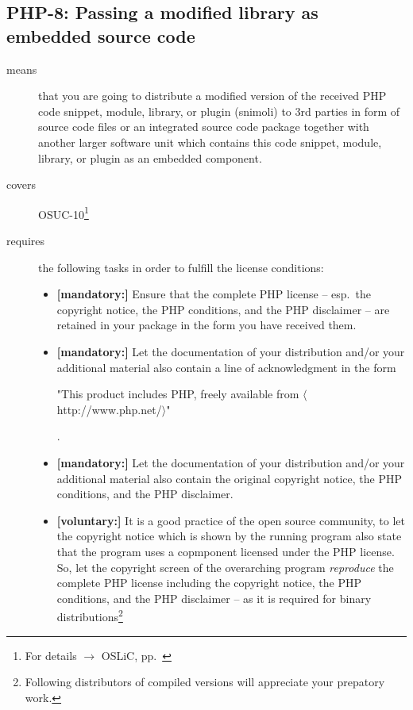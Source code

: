 \subsection{PHP-8: Passing a modified library as embedded source code}
\label{OSUC-10-PHP}
\begin{description}
\item[means] that you are going to distribute a modified version of the received
PHP code snippet, module, library, or plugin (snimoli) to 3rd parties in form
of source code files or an integrated source code package together with
another larger software unit which contains this code snippet, module, library,
or plugin as an embedded component.
\item[covers] OSUC-10\footnote{For details $\rightarrow$ OSLiC, pp.\ \pageref{OSUC-10-DEF}}
\item[requires] the following tasks in order to fulfill the license conditions:
\begin{itemize}
  
  \item \textbf{[mandatory:]} Ensure that the complete PHP license -- esp.\
  the copyright notice, the PHP conditions, and the PHP disclaimer -- are
  retained in your package in the form you have received them.
  
  \item \textbf{[mandatory:]} Let the documentation of your distribution and/or
  your additional material also contain a line of acknowledgment in the form
   \begin{footnotesize}"This product includes PHP, freely available from
  $\langle$http://www.php.net/$\rangle$"\end{footnotesize}.
    
  \item \textbf{[mandatory:]} Let the documentation of your distribution and/or
  your additional material also contain the original copyright notice, the PHP
  conditions, and the PHP disclaimer.

  \item \textbf{[voluntary:]} It is a good practice of the open source
  community, to let the copyright notice which is shown by the running program
  also state that the program uses a copmponent licensed under the PHP license.
  So, let the copyright screen of the overarching program \emph{reproduce} the
  complete PHP license including the copyright notice, the PHP conditions, and
  the PHP disclaimer -- as it is required for binary
  distributions\footnote{Following distributors of compiled versions will
  appreciate your prepatory work.}
  

\end{itemize}
\end{description}
